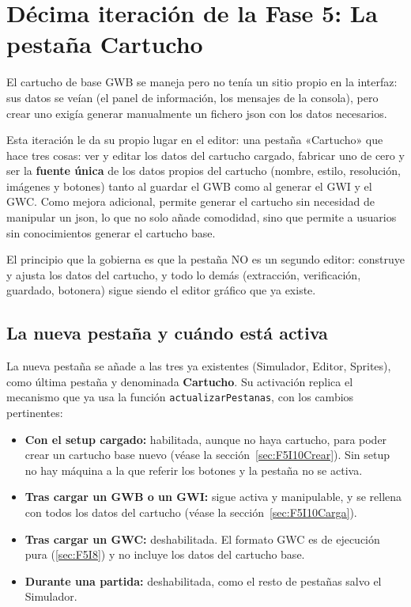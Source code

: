 \section{Décima iteración de la Fase 5: La pestaña Cartucho}\label{sec:F5I10}

El cartucho de base GWB se maneja pero no tenía un 
sitio propio en la interfaz:
sus datos se veían (el panel de información, los mensajes de
la consola), pero crear uno exigía generar manualmente 
un fichero json con los datos necesarios. 

Esta iteración le da su propio lugar en el editor: una pestaña
«Cartucho» que hace tres cosas: ver y editar los datos del cartucho
cargado, fabricar uno de cero y ser la \textbf{fuente única} de los datos 
propios del cartucho (nombre, estilo, resolución, imágenes y botones) 
tanto al guardar el GWB como al generar el GWI y el GWC. Como mejora adicional, 
permite generar el cartucho sin necesidad de manipular un json, lo que no solo añade 
comodidad, sino que permite a usuarios sin conocimientos generar el cartucho base.

El principio que la gobierna es que la pestaña NO es un segundo 
editor: construye y ajusta los datos del cartucho, y todo lo demás 
(extracción, verificación, guardado, botonera) sigue siendo el 
editor gráfico que ya existe.

\subsection{La nueva pestaña y cuándo está activa}
\label{sec:F5I10Pestanna}

La nueva pestaña se añade a las tres ya existentes (Simulador, Editor, 
Sprites), como última pestaña y denominada \textbf{Cartucho}. Su 
activación replica el mecanismo que ya usa la función 
\texttt{actualizarPestanas}, con los cambios pertinentes:

\begin{itemize}
	\item \textbf{Con el setup cargado:} habilitada, aunque no haya cartucho, para poder crear un cartucho base nuevo (véase la sección~\ref{sec:F5I10Crear}). Sin setup no hay máquina a la que referir los botones y la pestaña no se activa.
	
	\item \textbf{Tras cargar un GWB o un GWI:} sigue activa y manipulable, y se rellena con todos los datos del cartucho (véase la sección~\ref{sec:F5I10Carga}).
	
	\item \textbf{Tras cargar un GWC:} deshabilitada. El formato GWC es de ejecución pura (\ref{sec:F5I8}) y no incluye los datos del cartucho base.
	
	\item \textbf{Durante una partida:} deshabilitada, como el resto de pestañas salvo el Simulador.
\end{itemize}

